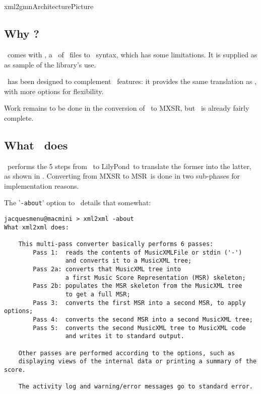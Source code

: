
\chapter{\xmlToGmn\ }

{xml2gmnArchitecturePicture}


\section{Why \xmlToGmn?}

\libmusicxml\ comes with \xmlToGuido, a \converter\ of \mxml\ files to \guido\ syntax, which has some limitations. It is supplied as as sample of the library's use.

\xmlToGmn\ has been designed to complement \libmusicxml\ features: it provides the same translation as \xmlToGuido, with more options for flexibility.

Work remains to be done in the conversion of \msrRepr\ to MXSR, but \xmlToGmn\ is already fairly complete.


\section{What \xmlToGmn\ does}

\xmlToGmn\ performs the 5 steps from \mxml\ to LilyPond\ to translate the former into the latter, as shown in . Converting from MXSR to MSR\ is done in two sub-phases for implementation reasons.

The '{\tt -about}' option to \xmlToGmn\ details that somewhat:
\begin{lstlisting}[language=MusicXML]
jacquesmenu@macmini > xml2xml -about
What xml2xml does:

    This multi-pass converter basically performs 6 passes:
        Pass 1:  reads the contents of MusicXMLFile or stdin ('-')
                 and converts it to a MusicXML tree;
        Pass 2a: converts that MusicXML tree into
                 a first Music Score Representation (MSR) skeleton;
        Pass 2b: populates the MSR skeleton from the MusicXML tree
                 to get a full MSR;
        Pass 3:  converts the first MSR into a second MSR, to apply options;
        Pass 4:  converts the second MSR into a second MusicXML tree;
        Pass 5:  converts the second MusicXML tree to MusicXML code
                 and writes it to standard output.

    Other passes are performed according to the options, such as
    displaying views of the internal data or printing a summary of the score.

    The activity log and warning/error messages go to standard error.
\end{lstlisting}
